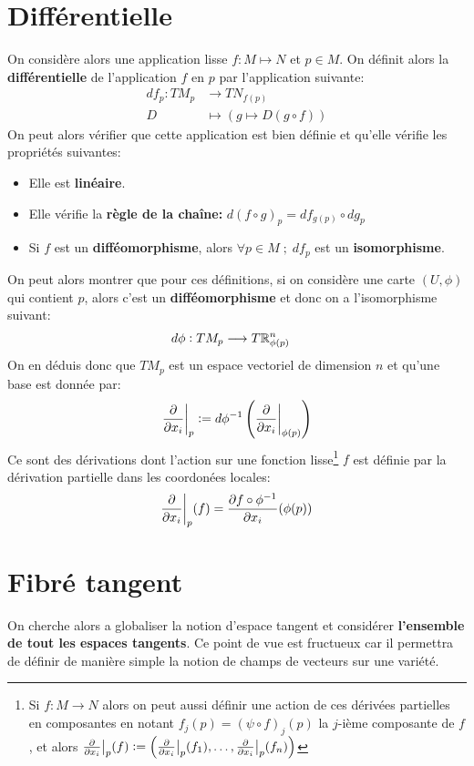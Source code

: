 \section{Différentielle}
On considère alors une application lisse \( f : M \longmapsto N \) et \( p \in M \). On définit alors la \textbf{différentielle} de l'application \( f \) en \( p \) par l'application suivante:
\[ 
   \begin{aligned}
      df_p : TM_p &\longrightarrow TN_{f(p)} \\
      D &\longmapsto \left( g \longmapsto D(g \circ f) \right)
   \end{aligned} 
\]
On peut alors vérifier que cette application est bien définie et qu'elle vérifie les propriétés suivantes:
\begin{itemize}
   \item Elle est \textbf{linéaire}.
   \item Elle vérifie la \textbf{règle de la chaîne:} \( d(f \circ g)_p = df_{g(p)} \circ dg_p \)
   \item Si \( f \) est un \textbf{difféomorphisme}, alors \( \forall p \in M \; ; \; df_p \) est un \textbf{isomorphisme}.
\end{itemize}
On peut alors montrer que pour ces définitions, si on considère une carte \( (U, \phi) \) qui contient \( p \), alors c'est un \textbf{difféomorphisme} et donc on a l'isomorphisme suivant:
\[ 
   \begin{aligned}
      d\phi : TM_p &\longrightarrow T\mathbb{R}_{\phi(p)}^n
   \end{aligned} 
\]
On en déduis donc que \( TM_p \) est un espace vectoriel de dimension \( n \) et qu'une base  est donnée par:
\[ 
   \frac{\partial }{\partial x_i}\biggr|_p := d\phi^{-1}\left( \frac{\partial }{\partial x_i}\biggr|_{\phi(p)}\right) 
\]
Ce sont des dérivations dont l'action sur une fonction lisse\footnote[1]{Si \( f : M \longrightarrow N \) alors on peut aussi définir une action de ces dérivées partielles en composantes en notant \( f_j(p) = (\psi \circ f)_j(p) \) la \( j \)-ième composante de \( f \), et alors \( \frac{\partial }{\partial x_i}\bigr|_p(f) := \left(\frac{\partial }{\partial x_i}\bigr|_p(f_1), \ldots,  \frac{\partial }{\partial x_i}\bigr|_p(f_n)\right) \)} \( f \) est définie par la dérivation partielle dans les coordonées locales:
\[ 
   \frac{\partial }{\partial x_i}\biggr|_p(f) = \frac{\partial f \circ \phi^{-1}}{\partial x_i}(\phi(p))
\]

\pagebreak
\section{Fibré tangent}
On cherche alors a globaliser la notion d'espace tangent et considérer \textbf{l'ensemble de tout les espaces tangents}. Ce point de vue est fructueux car il permettra de définir de manière simple la notion de champs de vecteurs sur une variété.\< 

